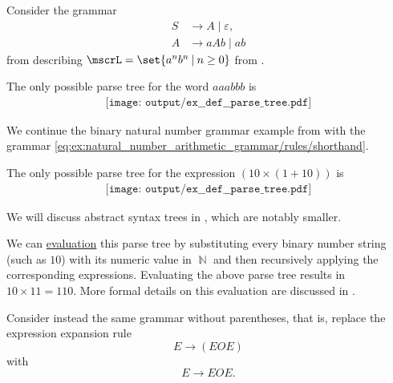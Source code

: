 \begin{example}
\begin{thmenum}
     Consider the grammar
    \begin{equation*}
      \begin{aligned}
        S &\to A \mid \varepsilon, \\
        A &\to aAb \mid ab
      \end{aligned}
    \end{equation*}
    from  describing \( \mscrL = \set{ a^n b^n \given n \geq 0 } \) from .

    The only possible parse tree for the word \( aaabbb \) is
    \begin{equation*}
      \begin{aligned}
        \texttt{[image: output/ex\_\_def\_\_parse\_tree.pdf]}
      \end{aligned}
    \end{equation*}

     We continue the binary natural number grammar example from  with the grammar \eqref{eq:ex:natural_number_arithmetic_grammar/rules/shorthand}.

    The only possible parse tree for the expression \( (10 \times (1 + 10)) \) is
    \begin{equation*}
      \begin{aligned}
        \texttt{[image: output/ex\_\_def\_\_parse\_tree.pdf]}
      \end{aligned}
    \end{equation*}

    We will discuss abstract syntax trees in , which are notably smaller.

    We can \hyperref[rem:evaluation]{evaluation} this parse tree by substituting every binary number string (such as \( 10 \)) with its numeric value in \( \BbbN \) and then recursively applying the corresponding expressions. Evaluating the above parse tree results in \( 10 \times 11 = 110 \). More formal details on this evaluation are discussed in .

    Consider instead the same grammar without parentheses, that is, replace the expression expansion rule
    \begin{equation*}
      E \to (E O E)
    \end{equation*}
    with
    \begin{equation*}
      E \to E O E.
    \end{equation*}


\end{thmenum}
\end{example}

